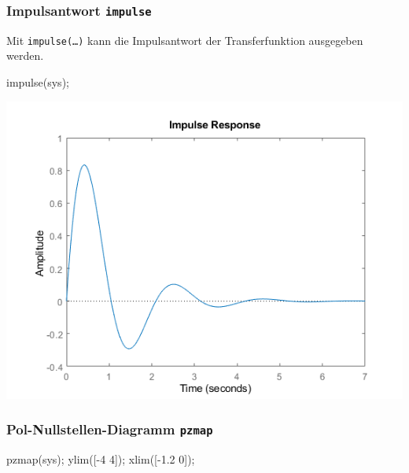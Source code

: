 \documentclass[
  10pt,
  a4paper,
  german]{article}
\newenvironment{Shaded}{}{}
\newcommand{\FloatTok}[1]{\textcolor[rgb]{0.00,0.36,0.77}{#1}}
\newcommand{\NormalTok}[1]{\textcolor[rgb]{0.14,0.16,0.18}{#1}}
\newcommand{\OperatorTok}[1]{\textcolor[rgb]{0.14,0.16,0.18}{#1}}
\newcommand{\VariableTok}[1]{\textcolor[rgb]{0.89,0.38,0.04}{#1}}
\numberwithin{equation}{section}
\begin{document}
\begin{multicols}{2}
\hypertarget{impulsantwort-impulse}{%
\subsubsection{\texorpdfstring{Impulsantwort
\texttt{impulse}}{Impulsantwort impulse}}\label{impulsantwort-impulse}}

Mit \texttt{impulse(…)} kann die Impulsantwort der Transferfunktion
ausgegeben werden.

\begin{Shaded}
\begin{Highlighting}[]
\VariableTok{impulse}\NormalTok{(}\VariableTok{sys}\NormalTok{)}\OperatorTok{;}
\end{Highlighting}
\end{Shaded}

\includegraphics{images/matlab_ImpulseResponsePlot.png}

\hypertarget{pol-nullstellen-diagramm-pzmap}{%
\subsubsection{\texorpdfstring{Pol-Nullstellen-Diagramm
\texttt{pzmap}}{Pol-Nullstellen-Diagramm pzmap}}\label{pol-nullstellen-diagramm-pzmap}}

\begin{Shaded}
\begin{Highlighting}[]
\VariableTok{pzmap}\NormalTok{(}\VariableTok{sys}\NormalTok{)}\OperatorTok{;}
\VariableTok{ylim}\NormalTok{([}\OperatorTok{{-}}\FloatTok{4} \FloatTok{4}\NormalTok{])}\OperatorTok{;} \VariableTok{xlim}\NormalTok{([}\OperatorTok{{-}}\FloatTok{1.2} \FloatTok{0}\NormalTok{])}\OperatorTok{;}
\end{Highlighting}
\end{Shaded}


\end{multicols}
\end{document}

